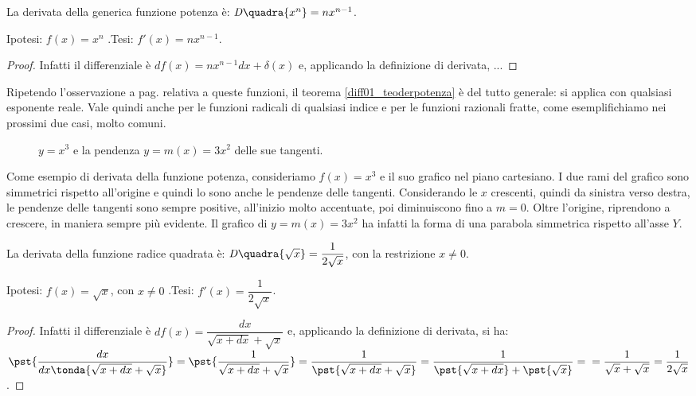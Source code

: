 \begin{teorema}
  \label{diff01_teoderpotenza}
  La derivata della generica funzione potenza è: $\mathit{D}\quadra{x^n}=
  nx^{n-1}$.
\end{teorema}
\noindent Ipotesi: $f(x)=x^n$ .\tab Tesi: $f'(x)=nx^{n-1}$.
\begin{proof}
  Infatti il differenziale è $df(x)=nx^{n-1}dx+ \delta(x)$ e,
  applicando la definizione di derivata, ...
\end{proof}

\begin{osservazione}
 Ripetendo l'osservazione a pag.\pageref{subsubsec:diff01_diffpot} relativa 
 a queste funzioni, il teorema \ref{diff01_teoderpotenza} è del tutto generale: 
si  applica con qualsiasi esponente reale.
Vale quindi anche per le funzioni radicali di qualsiasi indice e per le funzioni
razionali fratte, come esemplifichiamo nei prossimi due casi, molto comuni.
\end{osservazione}

\begin{figure}[h!]
\begin{inaccessibleblock}
 \begin{center}
 \begin{minipage}[]{.48\textwidth}
 \cubica
 \end{minipage} 
 \hfill
 \begin{minipage}[]{.48\textwidth}
  \tangenticubica
 \end{minipage}
 \end{center}
\end{inaccessibleblock}
\caption{$y=x^3$ e la pendenza $y=m(x)=3x^2$ delle sue tangenti.} 
\label{}
\end{figure}
Come esempio di derivata della funzione potenza, consideriamo $f(x)=x^3$
e il suo grafico nel piano cartesiano. I due rami del grafico sono 
simmetrici
rispetto all'origine e quindi lo sono anche le pendenze delle tangenti. 
Considerando le $x$ crescenti, quindi da sinistra verso destra, le pendenze 
delle tangenti sono sempre positive, all'inizio molto accentuate, poi 
diminuiscono fino a $m=0$. Oltre l'origine, riprendono a crescere, in maniera 
sempre più evidente. Il grafico di $y=m(x)=3 x^2$ ha infatti la forma di una 
parabola simmetrica rispetto all'asse $Y$.


\begin{corollario}
  La derivata della funzione radice quadrata è: 
$\mathit{D}\quadra{\sqrt{x}}=
    \dfrac{1}{2\sqrt{x}}$, con la restrizione $x\ne 0$.
\end{corollario}
\noindent Ipotesi: $f(x)=\sqrt{x}$, con $x\ne 0$ .\tab Tesi: 
    $f'(x)=\dfrac{1}{2\sqrt{x}}$.
\begin{proof}
  Infatti il differenziale è $df(x)=\dfrac{dx}{\sqrt{x+dx}+\sqrt{x}}$ e,
  applicando la definizione di derivata, si ha:\\
  $\pst{\dfrac{dx}{dx\tonda{\sqrt{x+dx}+\sqrt{x}}}}=
  \pst{\dfrac{1}{\sqrt{x+dx}+\sqrt{x}}}=
      \dfrac{1}{\pst{\sqrt{x+dx}+\sqrt{x}}}=
      \dfrac{1}{\pst{\sqrt{x+dx}}+\pst{\sqrt{x}}}=\\
      =\dfrac{1}{\sqrt{x}+\sqrt{x}}=\dfrac{1}{2\sqrt{x}}$.
\end{proof}

